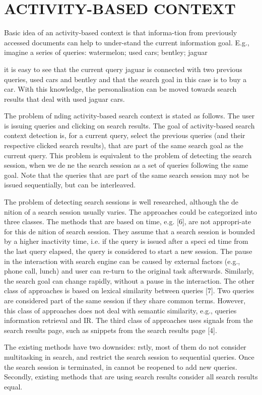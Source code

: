 \documentclass{acm_proc_article-sp} %
\begin{document}
\section{ACTIVITY-BASED CONTEXT}
Basic idea of an activity-based context is that informa-tion from previously accessed documents can help to under-stand the current information goal. E.g., imagine a series of queries: watermelon; used cars; bentley; jaguar { it is easy to see that the current query jaguar is connected with two previous queries, used cars and bentley and that the search goal in this case is to buy a car. With this knowledge, the personalisation can be moved towards search results that deal with used jaguar cars.

The problem of nding activity-based search context is stated as follows. The user is issuing queries and clicking on search results. The goal of activity-based search context detection is, for a current query, select the previous queries (and their respective clicked search results), that are part of the same search goal as the current query. This problem is equivalent to the problem of detecting the search session, when we de ne the search session as a set of queries following the same goal. Note that the queries that are part of the same search session may not be issued sequentially, but can be interleaved.

The problem of detecting search sessions is well researched, although the de nition of a search session usually varies. The approaches could be categorized into three classes. The methods that are based on time, e.g. [6], are not appropri-ate for this de nition of search session. They assume that a search session is bounded by a higher inactivity time, i.e. if the query is issued after a speci ed time from the last query elapsed, the query is considered to start a new session. The pause in the interaction with search engine can be caused by external factors (e.g., phone call, lunch) and user can re-turn to the original task afterwards. Similarly, the search goal can change rapidly, without a pause in the interaction. The other class of approaches is based on lexical similarity between queries [7]. Two queries are considered part of the same session if they share common terms. However, this class of approaches does not deal with semantic similarity, e.g., queries information retrieval and IR. The third class of
approaches uses signals from the search results page, such as snippets from the search results page [4].

The existing methods have two downsides: rstly, most of them do not consider multitasking in search, and restrict the search session to sequential queries. Once the search session is terminated, in cannot be reopened to add new queries. Secondly, existing methods that are using search results consider all search results equal.

}
\end{document}
